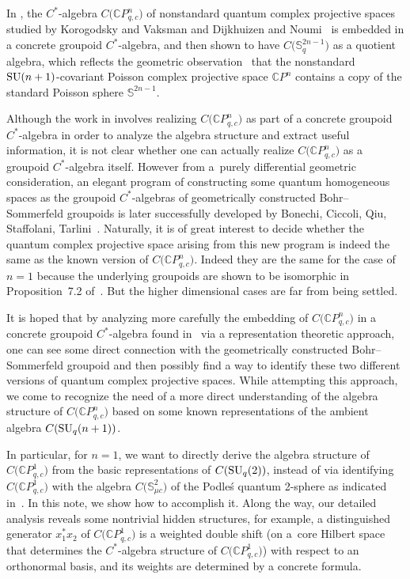 \documentclass[pdftex]{sigma}
\begin{document}
In \cite{Sh:qcp}, the $C^*$-algebra $C\big( \mathbb{C}P_{q,c}^{n}\big) $ of
nonstandard quantum complex projective spaces studied by Korogodsky and
Vaksman \cite{KoVa} and Dijkhuizen and Noumi~\cite{DiNo} is embedded in a
concrete groupoid $C^*$-algebra, and then shown to have $C\big( \mathbb{S}_{q}^{2n-1}\big) $ as a quotient algebra, which reflects the geometric observation~\cite{Sh:cp} that the nonstandard ${\rm SU}( n+1)
$-covariant Poisson complex projective space $\mathbb{C}P^{n}$ contains a copy
of the standard Poisson sphere $\mathbb{S}^{2n-1}$.

Although the work in \cite{Sh:qcp} involves realizing $C\big( \mathbb{C}P_{q,c}^{n}\big) $ as part of a concrete groupoid $C^*$-algebra in order to analyze the algebra structure and extract useful information, it is not clear
whether one can actually realize $C\big( \mathbb{C}P_{q,c}^{n}\big) $ as
a groupoid $C^*$-algebra itself. However from a~purely differential geometric
consideration, an elegant program of constructing some quantum homogeneous
spaces as the groupoid $C^*$-algebras of geometrically constructed
Bohr--Sommerfeld groupoids is later successfully developed by Bonechi, Ciccoli,
Qiu, Staffolani, Tarlini~\cite{BCQT, BCST}. Naturally, it is of great interest
to decide whether the quantum complex projective space arising from this new
program is indeed the same as the known version of $C\big( \mathbb{C}P_{q,c}^{n}\big) $. Indeed they are the same for the case of $n=1$ because the underlying groupoids are shown to be isomorphic in Proposition~7.2 of~\cite{BCQT}. But the higher dimensional cases are far from being settled.

It is hoped that by analyzing more carefully the embedding of $C\big(\mathbb{C}P_{q,c}^{n}\big) $ in a concrete groupoid $C^*$-algebra found in~\cite{Sh:qcp} via a representation theoretic approach, one can see some direct
connection with the geometrically constructed Bohr--Sommerfeld groupoid and
then possibly find a way to identify these two different versions of quantum
complex projective spaces. While attempting this approach, we come to
recognize the need of a more direct understanding of the algebra structure of
$C\big( \mathbb{C}P_{q,c}^{n}\big) $ based on some known representations
of the ambient algebra $C( {\rm SU}_{q}( n+1)) $.

In particular, for $n=1$, we want to directly derive the algebra structure of
$C\big( \mathbb{C}P_{q,c}^{1}\big) $ from the basic representations of
$C( {\rm SU}_{q}(2)) $, instead of via identifying
$C\big( \mathbb{C}P_{q,c}^{1}\big) $ with the algebra $C\big(\mathbb{S}_{\mu c}^{2}\big) $ of the Podle\'{s} quantum 2-sphere \cite{Po}
as indicated in~\cite{DiNo, KoVa}. In this note, we show how to accomplish it.
Along the way, our detailed analysis reveals some nontrivial hidden
structures, for example, a distinguished generator $x_{1}^{\ast}x_{2}$ of
$C\big( \mathbb{C}P_{q,c}^{1}\big) $ is a weighted double shift (on a~core Hilbert space that determines the $C^*$-algebra structure of $C\big(\mathbb{C}P_{q,c}^{1}\big) $) with respect to an orthonormal basis, and its weights are determined by a concrete formula.
\end{document}
